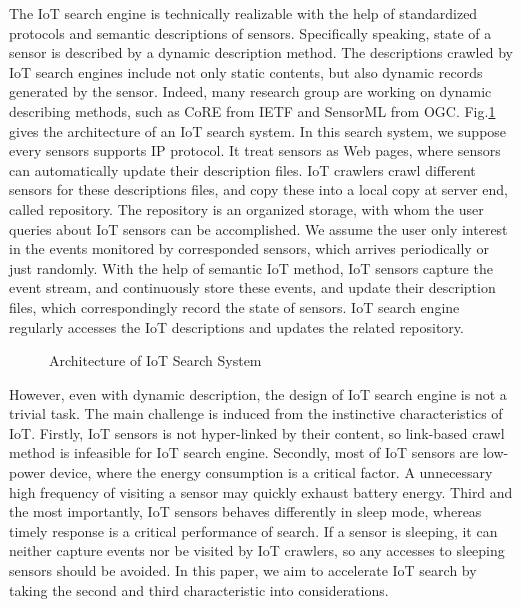 \documentclass[conference]{IEEEtran}
\begin{document}
The IoT search engine is technically realizable with the help of standardized protocols and semantic descriptions of sensors\cite{Pfisterer2011}. 
Specifically speaking, state of a sensor is described by a dynamic description method.
The descriptions crawled by IoT search engines include not only static contents, but also dynamic records generated by the sensor. 
Indeed, many research group are working on dynamic describing methods, such as CoRE\cite{CoREWorkingGroup2012} from IETF and SensorML\cite{botts2007opengis} from OGC. 
Fig.\ref{fig:architecture} gives the architecture of an IoT search system.
In this search system, we suppose every sensors supports IP protocol.
It treat sensors as Web pages, where sensors can automatically update their description files.
IoT crawlers crawl different sensors for these descriptions files, and copy these into a local copy at server end, called repository. The repository is an organized storage, with whom the user queries about IoT sensors can be accomplished.
We assume the user only interest in the events monitored by corresponded sensors, which arrives periodically or just randomly. 
With the help of semantic IoT method, IoT sensors capture the event stream, and continuously store these events, and update their description files, which correspondingly record the state of sensors. 
IoT search engine regularly accesses the IoT descriptions and updates the related repository.
\begin{figure}
	\centering
	
	\captionsetup{justification=centering}
	\caption{Architecture of IoT Search System}
	\label{fig:architecture}
\end{figure}

However, even with dynamic description, the design of IoT search engine is not a trivial task. The main challenge is induced from the instinctive characteristics of IoT. 
Firstly, IoT sensors is not hyper-linked by their content, so link-based crawl method is infeasible for IoT search engine. 
Secondly, most of IoT sensors are low-power device, where the energy consumption is a critical factor. A unnecessary high frequency of visiting a sensor may quickly exhaust battery energy.
Third and the most importantly, IoT sensors behaves differently in sleep mode, whereas timely response is a critical performance of search. 
If a sensor is sleeping, it can neither capture events nor be visited by IoT crawlers, so any accesses to sleeping sensors should be avoided.
In this paper, we aim to accelerate IoT search by taking the second and third characteristic into considerations.
\end{document}
